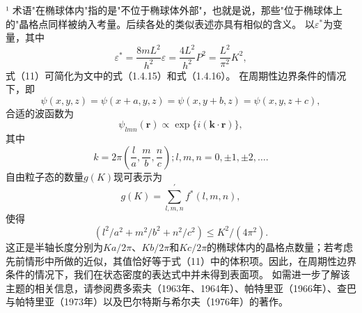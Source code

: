 ¹ 术语"在椭球体内"指的是"不位于椭球体外部"，也就是说，那些"位于椭球体上的"晶格点同样被纳入考量。后续各处的类似表述亦具有相似的含义。
以\(\varepsilon^{*}\)为变量，其中
\begin{equation}\tag{17.1.12}\label{eq:17.1.12}
\varepsilon ^{*} = \frac { 8 m L ^{2} } { h ^{2} } \varepsilon = \frac { 4 L ^{2} } { h ^{2} } P ^{2} = \frac { L ^{2} } { \pi ^{2} } K ^{2} ,
\end{equation}
式（11）可简化为文中的式（1.4.15）和式（1.4.16）。
在周期性边界条件的情况下，即
\begin{equation}\tag{17.1.13}\label{eq:17.1.13}
\psi ( x , y , z ) = \psi ( x + a , y , z ) = \psi ( x , y + b , z ) = \psi ( x , y , z + c ) ,
\end{equation}
合适的波函数为
\begin{equation}\tag{17.1.14}\label{eq:17.1.14}
\psi _ { l m n } ( \mathbf { r } ) \propto \exp \{ i ( \mathbf { k } \cdot \mathbf { r } ) \} ,
\end{equation}
其中
\begin{equation}\tag{17.1.15}\label{eq:17.1.15}
k = 2 \pi \left( { \frac { l } { a } } , { \frac { m } { b } } , { \frac { n } { c } } \right) ;  l , m , n = 0 , \pm 1 , \pm 2 , \ldots .
\end{equation}
自由粒子态的数量\(g(K)\)现可表示为
\begin{equation}\tag{17.1.16}\label{eq:17.1.16}
g ( K ) = \sum _ { l , m , n } ^{\prime} f ^{*} ( l , m , n ) ,
\end{equation}
使得
\begin{equation}\tag{17.1.17}\label{eq:17.1.17}
( l ^{2} / a ^{2} + m ^{2} / b ^{2} + n ^{2} / c ^{2} ) \leq K ^{2} / ( 4 \pi ^{2} ) .
\end{equation}
这正是半轴长度分别为\(Ka/2\pi\)、\(Kb/2\pi\)和\(Kc/2\pi\)的椭球体内的晶格点数量；若考虑先前情形中所做的近似，其值恰好等于式（11）中的体积项。因此，在周期性边界条件的情况下，我们在状态密度的表达式中并未得到表面项。
如需进一步了解该主题的相关信息，请参阅费多索夫（1963年、1964年）、帕特里亚（1966年）、查巴与帕特里亚（1973年）以及巴尔特斯与希尔夫（1976年）的著作。

